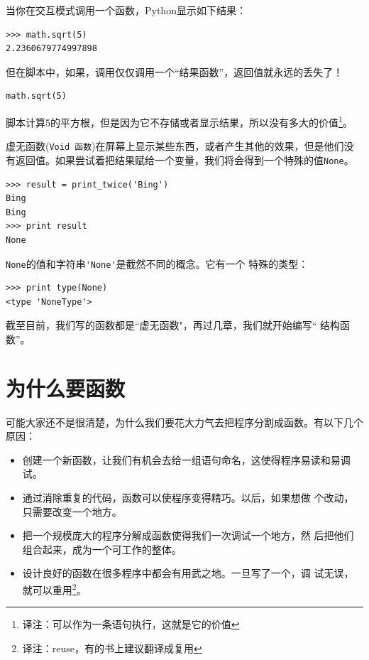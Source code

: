 当你在交互模式调用一个函数，Python显示如下结果：

\beforeverb
\begin{verbatim}
>>> math.sqrt(5)
2.2360679774997898
\end{verbatim}
\afterverb

但在脚本中，如果，调用仅仅调用一个“结果函数”，返回值就永远的丢失了！

\beforeverb
\begin{verbatim}
math.sqrt(5)
\end{verbatim}
\afterverb

脚本计算5的平方根，但是因为它不存储或者显示结果，所以没有多大的价值\footnote{译注：可以作为一条语句执行，这就是它的价值}。


虚无函数({\tt Void 函数})在屏幕上显示某些东西，或者产生其他的效果，但是他们没有返回值。如果尝试着把结果赋给一个变量，我们将会得到一个特殊的值{\tt None}。


\beforeverb
\begin{verbatim}
>>> result = print_twice('Bing')
Bing
Bing
>>> print result
None
\end{verbatim}
\afterverb

{\tt None}的值和字符串\verb"'None'"是截然不同的概念。它有一个
特殊的类型：

\beforeverb
\begin{verbatim}
>>> print type(None)
<type 'NoneType'>
\end{verbatim}
\afterverb

截至目前，我们写的函数都是“虚无函数"，再过几章，我们就开始编写“
结构函数”。

\section{为什么要函数}

可能大家还不是很清楚，为什么我们要花大力气去把程序分割成函数。有以下几个原因：

\begin{itemize}

\item 创建一个新函数，让我们有机会去给一组语句命名，这使得程序易读和易调试。

\item 通过消除重复的代码，函数可以使程序变得精巧。以后，如果想做
个改动，只需要改变一个地方。

\item 把一个规模庞大的程序分解成函数使得我们一次调试一个地方，然
后把他们组合起来，成为一个可工作的整体。

\item 设计良好的函数在很多程序中都会有用武之地。一旦写了一个，调
试无误，就可以重用\footnote{译注：reuse，有的书上建议翻译成复用
}。

\end{itemize}

